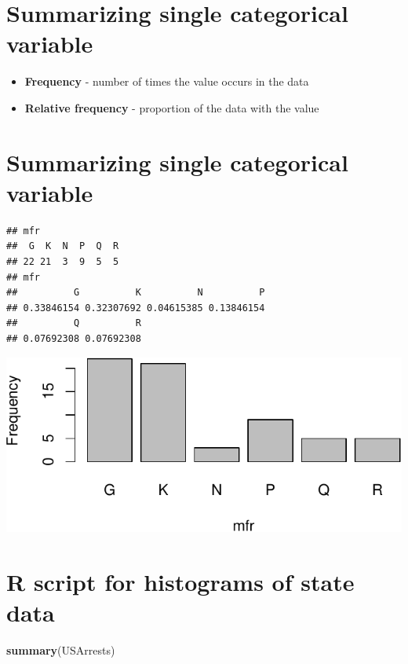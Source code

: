 \documentclass[]{tufte-handout}
\newenvironment{Shaded}{}{}
\newcommand{\KeywordTok}[1]{\textcolor[rgb]{0.00,0.44,0.13}{\textbf{#1}}}
\newcommand{\NormalTok}[1]{#1}
\providecommand{\tightlist}{%
  \setlength{\itemsep}{0pt}\setlength{\parskip}{0pt}}
\begin{document}
\section{Summarizing single categorical
variable}\label{summarizing-single-categorical-variable}

\begin{itemize}
\tightlist
\item
  \textbf{Frequency} - number of times the value occurs in the data
\item
  \textbf{Relative frequency} - proportion of the data with the value
\end{itemize}

\section{Summarizing single categorical
variable}\label{summarizing-single-categorical-variable-1}

\begin{verbatim}
## mfr
##  G  K  N  P  Q  R 
## 22 21  3  9  5  5 
## mfr
##          G          K          N          P 
## 0.33846154 0.32307692 0.04615385 0.13846154 
##          Q          R 
## 0.07692308 0.07692308
\end{verbatim}

\includegraphics{data_collection_summary_files/figure-latex/unnamed-chunk-1-1}

\section{R script for histograms of state
data}\label{r-script-for-histograms-of-state-data}

\begin{Shaded}
\begin{Highlighting}[]
\KeywordTok{summary}\NormalTok{(USArrests)}
\end{Highlighting}
\end{Shaded}
\end{document}
